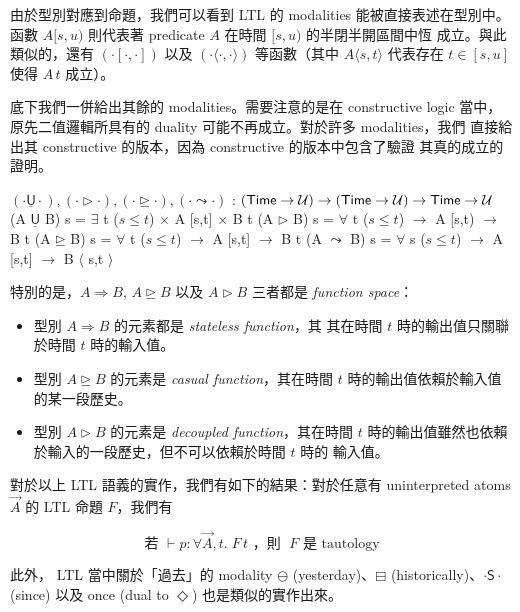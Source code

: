 \documentclass{article}
\newcommand{\U}{\mathcal{U}}
\begin{document}
  由於型別對應到命題，我們可以看到 LTL 的 modalities 能被直接表述在型別中。
  函數 $A [s,u)$ 則代表著 predicate $A$ 在時間 $[s,u)$ 的半閉半開區間中恆
  成立。與此類似的，還有 $(\cdot[\cdot,\cdot])$ 以及
  $(\cdot\langle\cdot,\cdot\rangle)$ 等函數（其中 $A\langle s,t\rangle$
  代表存在 $t\in [s,u]$ 使得 $A\,t$ 成立）。

  底下我們一併給出其餘的 modalities。需要注意的是在 constructive logic
  當中，原先二值邏輯所具有的 duality 可能不再成立。對於許多 modalities，我們
  直接給出其 constructive 的版本，因為 constructive 的版本中包含了驗證
  其真的成立的證明。

  \begin{code}
  $(\cdot\underline{\mathsf{U}}\cdot),(\cdot\rhd\cdot),(\cdot\unrhd\cdot),(\cdot\leadsto\cdot)$ : $(\Time\to\U)\to(\Time\to\U)\to\Time\to\U$
  (A $\underline{\mathsf{U}}$ B) s = $\exists$ {t} ($s\le t$) $\times$ A [s,t] $\times$ B t
  (A $\rhd$ B) s = $\forall$ {t} ($s\le t$) $\to$ A [s,t) $\to$ B t
  (A $\unrhd$ B) s = $\forall$ {t} ($s\le t$) $\to$ A [s,t] $\to$ B t
  (A $\leadsto$ B) s = $\forall$ {s} ($s\le t$) $\to$ A [s,t] $\to$ B $\langle$ s,t $\rangle$
  \end{code}

  特別的是，$A\Rightarrow B$, $A\unrhd B$ 以及 $A\rhd B$ 三者都是
  \emph{function space}：

  \begin{itemize}
    \item 型別 $A\Rightarrow B$ 的元素都是 \emph{stateless function}，其
    其在時間 $t$ 時的輸出值只關聯於時間 $t$ 時的輸入值。

    \item 型別 $A\unrhd B$ 的元素是 \emph{casual function}，其在時間 $t$
    時的輸出值依賴於輸入值的某一段歷史。

    \item 型別 $A\rhd B$ 的元素是 \emph{decoupled function}，其在時間 $t$
    時的輸出值雖然也依賴於輸入的一段歷史，但不可以依賴於時間 $t$ 時的
    輸入值。
  \end{itemize}

  對於以上 LTL 語義的實作，我們有如下的結果：對於任意有 uninterpreted atoms
  $\overrightarrow{A}$ 的 LTL 命題 $F$，我們有

  \[ \text{若 } \vdash p:\forall{\overrightarrow{A}},t.\; F\,t \text{ ，則 } \;F \text{ 是 tautology}\]

  此外， LTL 當中關於「過去」的 modality $\ominus$ (yesterday)、$\boxminus$
  (historically)、$\cdot\mathsf{S}\cdot$ (since) 以及 once (dual to $\Diamond$)
  也是類似的實作出來。
\end{document}

